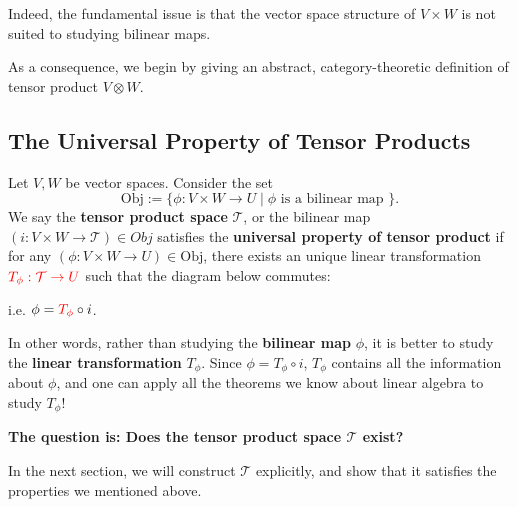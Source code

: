 Indeed, the fundamental issue is that the vector space structure of \( V \times W \) is not suited to studying bilinear maps.

\medskip

As a consequence, we begin by giving an abstract, category-theoretic definition of tensor product \( V \otimes W \).

\subsection{The Universal Property of Tensor Products}

\begin{definition}\label{def:univtensor}
Let \(V,W\) be vector spaces. Consider the set
\[
\text{Obj} :=  \{ \phi  : V \times  W \rightarrow  U \mid  \phi \text{ is a bilinear map }\}.
\]
We say the {\bf tensor product space} \(\mathcal{T}\), or the bilinear map \(\left( {i : V \times  W \rightarrow  \mathcal{T}}\right)  \in Obj\) satisfies the {\bf universal property of tensor product} if for any \((\phi  : V \times  W \rightarrow U) \in  \mathrm{{Obj}}\), there exists an unique linear transformation \(\color{red} T_{\phi } : \mathcal{T} \rightarrow  U\) such that the diagram below commutes:


\begin{center}
 \quad \quad \quad i.e. \(\phi  = {\color{red} T_{\phi}} \circ  i\).
\end{center} 

\end{definition}

\noindent
In other words, rather than studying the \textbf{bilinear map} \( \phi \), it is better to study the \textbf{linear transformation} \( T_\phi \). Since \( \phi = T_\phi \circ i \), \( T_\phi \) contains all the information about \( \phi \), and one can apply all the theorems we know about linear algebra to study \( T_\phi \)!

\bigskip

\noindent
\textbf{\Large The question is: Does the tensor product space \( \mathcal{T} \) exist?}

\bigskip

\noindent
In the next section, we will construct \( \mathcal{T} \) explicitly, and show that it satisfies the properties we mentioned above.


